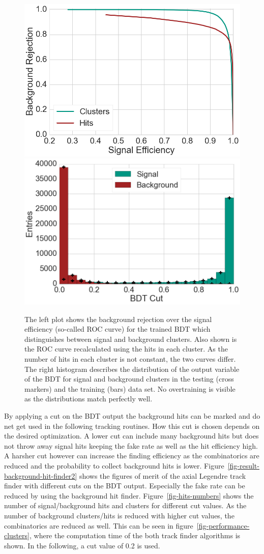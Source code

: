 \begin{figure}
  \centering
  \includegraphics[width=0.48\linewidth]{figures/workflow/background_hit_finder_roc.png}
  \includegraphics[width=0.48\linewidth]{figures/workflow/background_hit_finder_overtraining.png}
  \caption{The left plot shows the background rejection over the signal efficiency (so-called ROC curve) for the trained BDT which distinguishes between signal and background clusters. Also shown is the ROC curve recalculated using the hits in each cluster. As the number of hits in each cluster is not constant, the two curves differ. The right histogram describes the distribution of the output variable of the BDT for signal and background clusters in the testing (cross markers) and the training (bars) data set. No overtraining is visible as the distributions match perfectly well.}
  \label{fig-result-background-hit-finder}
\end{figure}

By applying a cut on the BDT output the background hits can be marked and do net get used in the following tracking routines. How this cut is chosen depends on the desired optimization. A lower cut can include many background hits but does not throw away signal hits keeping the fake rate as well as the hit efficiency high. A harsher cut however can increase the finding efficiency as the combinatorics are reduced and the probability to collect background hits is lower. Figure~\ref{fig-result-background-hit-finder2} shows the figures of merit of the axial Legendre track finder with different cuts on the BDT output. Especially the fake rate can be reduced by using the background hit finder. Figure~\ref{fig-hits-numbers} shows the number of signal/background hits and clusters for different cut values. As the number of background clusters/hits is reduced with higher cut values, the combinatorics are reduced as well. This can be seen in figure~\ref{fig-performance-clusters}, where the computation time of the both track finder algorithms is shown. In the following, a cut value of 0.2 is used.

